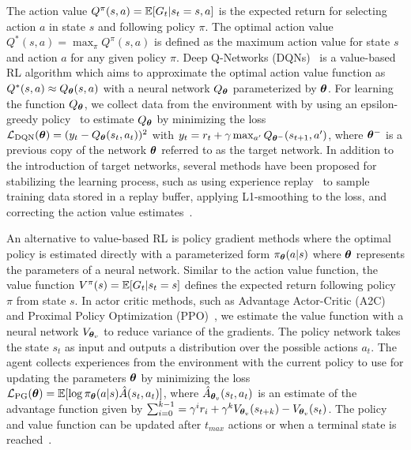 The action value $Q^{\pi}(s, a) = \mathbb{E}[G_t | s_t=s, a]$  is the expected return for selecting action $a$ in state $s$ and following policy $\pi$. The optimal action value $Q^{*}(s, a) = \max_{\pi} Q^{\pi}(s, a)$ is defined as the maximum action value for state $s$ and action $a$ for any given policy $\pi$. Deep Q-Networks (DQNs)~ is a value-based RL algorithm which aims to approximate the optimal action value function as $Q^{*}(s, a) \approx Q_{{\bm{\theta}}}(s, a)$ with a neural network $Q_{{\bm{\theta}}}$ parameterized by ${\bm{\theta}}$. For learning the function $Q_{{\bm{\theta}}}$, we collect data from the environment with by using an epsilon-greedy policy~ to estimate $Q_{{\bm{\theta}}}$ by minimizing the loss ${\mathcal{L}}_{\text{DQN}}({\bm{\theta}}) = (y_t - Q_{{\bm{\theta}}}(s_t, a_t))^2$ with $y_t = r_t + \gamma \max_{a'} Q_{{\bm{\theta}}^{-}}(s_{t+1}, a')$, where ${\bm{\theta}}^{-}$ is a previous copy of the network ${\bm{\theta}}$ referred to as the target network. In addition to the introduction of target networks, several methods have been proposed for stabilizing the learning process, such as using experience replay~ to sample training data stored in a replay buffer, applying L1-smoothing to the loss, and correcting the action value estimates~. 

An alternative to value-based RL is policy gradient methods where the optimal policy is estimated directly with a parameterized form $\pi_{{\bm{\theta}}}(a | s)$ where ${\bm{\theta}}$ represents the parameters of a neural network. 
Similar to the action value function, the value function $V^{\pi}(s) = \mathbb{E}[G_t | s_t=s]$ defines the expected return following policy $\pi$ from state $s$. In actor critic methods, such as Advantage Actor-Critic (A2C)~ and Proximal Policy Optimization (PPO)~, we estimate the value function with a neural network $V_{{\bm{\theta}}_v}$ to reduce variance of the gradients. 
The policy network takes the state $s_t$ as input and outputs a distribution over the possible actions $a_t$. The agent collects experiences from the environment with the current policy to use for updating the parameters ${\bm{\theta}}$ by minimizing the loss ${\mathcal{L}}_{\text{PG}}({\bm{\theta}}) = \mathbb{E}[\log \pi_{{\bm{\theta}}}(a | s) \hat{A}(s_t, a_t)]$, where $\hat{A}_{{\bm{\theta}}_v}(s_t, a_t)$ is an estimate of the advantage function given by $\sum_{i=0}^{k-1} = \gamma^{i} r_i + \gamma^{k} V_{{\bm{\theta}}_v}(s_{t+k}) - V_{{\bm{\theta}}_v}(s_{t})$. The policy and value function can be updated after $t_{max}$ actions or when a terminal state is reached~.

